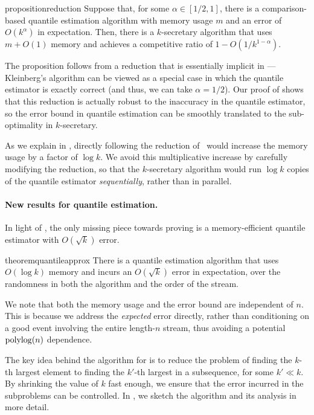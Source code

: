 \begin{restatable}{proposition}{reduction}\label{prop:reduction}
    Suppose that, for some $\alpha \in [1/2, 1]$, there is a comparison-based quantile estimation algorithm with memory usage $m$ and an error of $O(k^{\alpha})$ in expectation. Then, there is a $k$-secretary algorithm that uses $m + O(1)$ memory and achieves a competitive ratio of $1 -O(1/k^{1 - \alpha})$.
\end{restatable}

The proposition follows from a reduction that is essentially implicit in \cite{Kleinberg05}---Kleinberg's algorithm can be viewed as a special case in which the quantile estimator is exactly correct (and thus, we can take $\alpha = 1/2$). Our proof of  shows that this reduction is actually robust to the inaccuracy in the quantile estimator, so the error bound in quantile estimation can be smoothly translated to the sub-optimality in $k$-secretary.

As we explain in , directly following the reduction of~\cite{Kleinberg05} would increase the memory usage by a factor of $\log k$. We avoid this multiplicative increase by carefully modifying the reduction, so that the $k$-secretary algorithm would run $\log k$ copies of the quantile estimator \emph{sequentially}, rather than in parallel.

\paragraph{New results for quantile estimation.} In light of , the only missing piece towards proving  is a memory-efficient quantile estimator with $O(\sqrt{k})$ error.

\begin{restatable}{theorem}{quantileapprox}\label{thm:quantile-approx}
    There is a quantile estimation algorithm that uses $O(\log k)$ memory and incurs an $O(\sqrt{k})$ error in expectation, over the randomness in both the algorithm and the order of the stream.
\end{restatable}

We note that both the memory usage and the error bound are independent of $n$. This is because we address the \emph{expected} error directly, rather than conditioning on a good event involving the entire length-$n$ stream, thus avoiding a potential $\operatorname*{polylog}(n)$ dependence.

The key idea behind the algorithm for  is to reduce the problem of finding the $k$-th largest element to finding the $k'$-th largest in a subsequence, for some $k' \ll k$. By shrinking the value of $k$ fast enough, we ensure that the error incurred in the subproblems can be controlled. In , we sketch the algorithm and its analysis in more detail.

